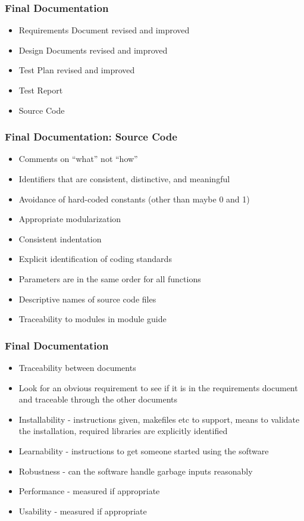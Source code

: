 \documentclass[t,12pt,numbers,fleqn]{beamer}
\begin{document}

\begin{frame}
\frametitle{Final Documentation}
\begin{itemize}
\item Requirements Document revised and improved
\item Design Documents revised and improved
\item Test Plan revised and improved
\item Test Report
\item Source Code
\end{itemize}
\end{frame}


\begin{frame}
\frametitle{Final Documentation: Source Code}
\begin{itemize}
\item Comments on ``what'' not ``how''
\item Identifiers that are consistent, distinctive, and meaningful
\item Avoidance of hard-coded constants (other than maybe 0 and 1)
\item Appropriate modularization
\item Consistent indentation
\item Explicit identification of coding standards
\item Parameters are in the same order for all functions
\item Descriptive names of source code files
\item Traceability to modules in module guide
\end{itemize}
\end{frame}


\begin{frame}
\frametitle{Final Documentation}
\begin{itemize}
\item Traceability between documents
\item Look for an obvious requirement to see if it is in the requirements
  document and traceable through the other documents
\item Installability - instructions given, makefiles etc to support, means to
  validate the installation, required libraries are explicitly identified
\item Learnability - instructions to get someone started using the software
\item Robustness - can the software handle garbage inputs reasonably
\item Performance - measured if appropriate
\item Usability - measured if appropriate
\end{itemize}
\end{frame}
\end{document}
